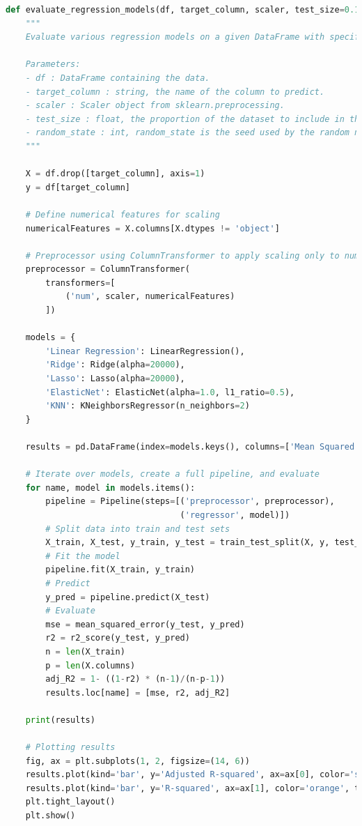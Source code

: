 \documentclass{article}
\theoremstyle{mytheoremstyle}
\theoremstyle{mytheoremstyle}
\theoremstyle{myproblemstyle}
\begin{document}
\begin{lstlisting}[language=Python, caption=Regression model pipeline code]
def evaluate_regression_models(df, target_column, scaler, test_size=0.1, random_state=123):
    """
    Evaluate various regression models on a given DataFrame with specified scaler.

    Parameters:
    - df : DataFrame containing the data.
    - target_column : string, the name of the column to predict.
    - scaler : Scaler object from sklearn.preprocessing.
    - test_size : float, the proportion of the dataset to include in the test split.
    - random_state : int, random_state is the seed used by the random number generator.
    """
    
    X = df.drop([target_column], axis=1)
    y = df[target_column]

    # Define numerical features for scaling
    numericalFeatures = X.columns[X.dtypes != 'object']

    # Preprocessor using ColumnTransformer to apply scaling only to numerical features
    preprocessor = ColumnTransformer(
        transformers=[
            ('num', scaler, numericalFeatures)
        ])

    models = {
        'Linear Regression': LinearRegression(),
        'Ridge': Ridge(alpha=20000),
        'Lasso': Lasso(alpha=20000),
        'ElasticNet': ElasticNet(alpha=1.0, l1_ratio=0.5),
        'KNN': KNeighborsRegressor(n_neighbors=2)
    }

    results = pd.DataFrame(index=models.keys(), columns=['Mean Squared Error', 'R-squared', 'Adjusted R-squared'])

    # Iterate over models, create a full pipeline, and evaluate
    for name, model in models.items():
        pipeline = Pipeline(steps=[('preprocessor', preprocessor),
                                   ('regressor', model)])
        # Split data into train and test sets
        X_train, X_test, y_train, y_test = train_test_split(X, y, test_size=test_size, random_state=random_state)
        # Fit the model
        pipeline.fit(X_train, y_train)
        # Predict
        y_pred = pipeline.predict(X_test)
        # Evaluate
        mse = mean_squared_error(y_test, y_pred)
        r2 = r2_score(y_test, y_pred)
        n = len(X_train)
        p = len(X.columns)
        adj_R2 = 1- ((1-r2) * (n-1)/(n-p-1))
        results.loc[name] = [mse, r2, adj_R2]

    print(results)

    # Plotting results
    fig, ax = plt.subplots(1, 2, figsize=(14, 6))
    results.plot(kind='bar', y='Adjusted R-squared', ax=ax[0], color='skyblue', title=f'Adjusted R-Squared by Model (Scaler: {scaler})')
    results.plot(kind='bar', y='R-squared', ax=ax[1], color='orange', title=f'R-squared by Model (Scaler: {scaler})')
    plt.tight_layout()
    plt.show()
\end{lstlisting}
\end{document}
